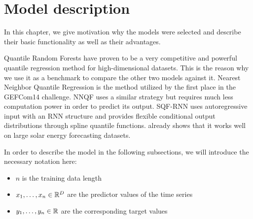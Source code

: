 \chapter{Model description}
\label{ch:model-description}

In this chapter, we give motivation why the models were selected and 
describe their basic functionality as well as their advantages.

Quantile Random Forests have proven to be a very competitive 
and powerful quantile regression method for high-dimensional datasets. 
This is the reason why we use it as a benchmark to compare the other two models 
against it.
Nearest Neighbor Quantile Regression is the method utilized by the first place 
in the GEFCom14 challenge. NNQF uses a similar strategy but requires much less 
computation power in order to predict its output. 
SQF-RNN uses autoregressive input with an RNN structure and provides flexible 
conditional output distributions through spline quantile functions. 
\Textcite{Gasthaus2019} already shows that it works well on large solar energy 
forecasting datasets.

In order to describe the model in the following subsections, we will introduce the necessary notation here:
\begin{itemize}
    \item \(n\) is the training data length
    \item \(x_1, \ldots, x_n \in \mathbb{R}^D\) are the predictor values of the time series
    \item \(y_1, \ldots, y_n \in \mathbb{R}\) are the corresponding target values
\end{itemize}





